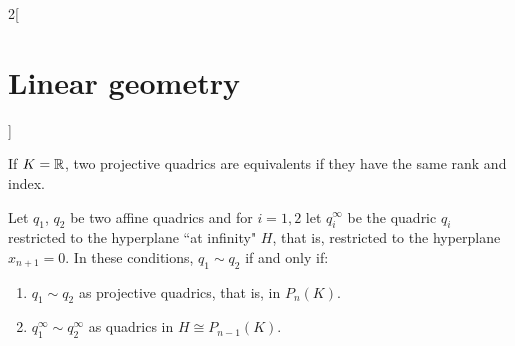\documentclass[../../../main_math.tex]{subfiles}
\begin{document}
\begin{multicols}{2}[\section{Linear geometry}]
  \begin{theorem}
    If $K=\mathbb{R} $, two projective quadrics are equivalents if they have the same rank and index.
  \end{theorem}
  \begin{theorem}
    Let $q_1$, $q_2$ be two affine quadrics and for $i=1,2$ let $q_i^\infty$ be the quadric $q_i$ restricted to the hyperplane ``at infinity" $H$, that is, restricted to the hyperplane $x_{n+1}=0$. In these conditions, $q_1\sim q_2$ if and only if:
    \begin{enumerate}
      \item $q_1\sim q_2$ as projective quadrics, that is, in $P_n(K)$.
      \item $q_1^\infty\sim q_2^\infty$ as quadrics in $H\cong P_{n-1}(K)$.
    \end{enumerate}
  \end{theorem}
\end{multicols}
\end{document}
